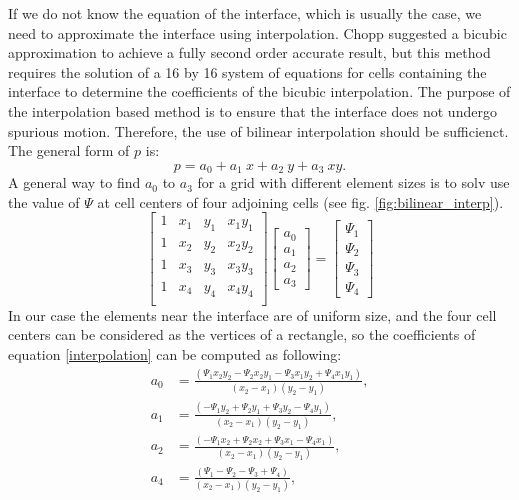 \documentclass[review]{elsarticle}
\begin{document}
If we do not know the equation of the interface, which is usually the case, 
we need to approximate the interface using interpolation. Chopp suggested a bicubic approximation \cite{Chopp2001} to achieve a fully second order accurate 
result, but this method requires the solution of a 16 by 16 system of equations for cells containing the interface to determine the coefficients 
of the bicubic interpolation. 
The purpose of the interpolation based method is to ensure that the interface does not undergo spurious motion.
Therefore, the use of bilinear interpolation should be sufficienct. The general form of $p$ is:
\begin{equation}\label{interpolation}
p=a_0+a_1 \ x+ a_2 \ y+ a_3 \ xy.
\end{equation} 
A general way to find $a_0$ to $a_3$ for a grid with different element sizes is to solv%
use the value of $\varPsi$  
at cell centers of four adjoining cells (see fig. \ref{fig:bilinear_interp}).
\begin{equation}
\label{bilin_system}
\begin{bmatrix}
    1 & x_1 & y_1 & x_1 y_1 \\
    1 & x_2 & y_2 & x_2 y_2 \\
    1 & x_3 & y_3 & x_3 y_3 \\
    1 & x_4 & y_4 & x_4 y_4 \\
\end{bmatrix}
\begin{bmatrix}
    a_0 \\
    a_1 \\
    a_2 \\
    a_3
\end{bmatrix}
=
\begin{bmatrix}
    \varPsi_1  \\
   \varPsi_2  \\
    \varPsi_3  \\
     \varPsi_4  
\end{bmatrix}
\end{equation} 
In our case the elements near the interface are of uniform size, and the four cell centers can be considered as the vertices of a rectangle, so the coefficients of 
equation \eqref{interpolation} can be computed as following:
\begin{subequations}
\begin{align}
a_0&=\frac{(\varPsi_1 x_2 y_2 - \varPsi_2 x_2 y_1 - \varPsi_3 x_1 y_2 + \varPsi_4 x_1 y_1)}{(x_2-x_1)(y_2-y_1)}, \\ 
a_1&=\frac{(-\varPsi_1 y_2 + \varPsi_2 y_1 + \varPsi_3 y_2 - \varPsi_4 y_1)}{(x_2-x_1)(y_2-y_1)},\\
a_2&=\frac{(-\varPsi_1 x_2 + \varPsi_2 x_2 + \varPsi_3 x_1 - \varPsi_4 x_1 )}{(x_2-x_1)(y_2-y_1)}, \\ 
a_4&=\frac{(\varPsi_1 - \varPsi_2 - \varPsi_3 + \varPsi_4)}{(x_2-x_1)(y_2-y_1)}, \\ 
\end{align}
\end{subequations}
\end{document}
